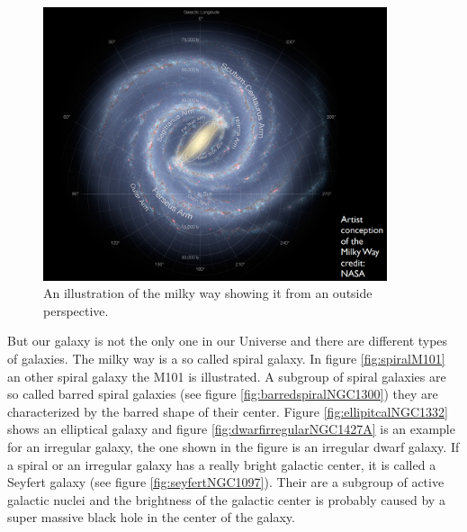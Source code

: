 \begin{figure}[H]
	\centering
		\includegraphics[width=0.9\textwidth]{img/ch-01/milkywayfromoutside.png}
		\caption{An illustration of the milky way showing it from an outside perspective.}
		\label{fig:milkywayoutside}
\end{figure}
But our galaxy is not the only one in our Universe and there are different types of galaxies. The milky way is a so called spiral galaxy. In figure \ref{fig:spiralM101} an other spiral galaxy the M101 is illustrated. A subgroup of spiral galaxies are so called barred spiral galaxies (see figure \ref{fig:barredspiralNGC1300}) they are characterized by the barred shape of their center. Figure \ref{fig:ellipitcalNGC1332} shows an elliptical galaxy and figure \ref{fig:dwarfirregularNGC1427A} is an example for an irregular galaxy, the one shown in the figure is an irregular dwarf galaxy. If a spiral or an irregular galaxy has a really bright galactic center, it is called a Seyfert galaxy (see figure \ref{fig:seyfertNGC1097}). Their are a subgroup of active galactic nuclei and the brightness of the galactic center is probably caused by a super massive black hole in the center of the galaxy. 
